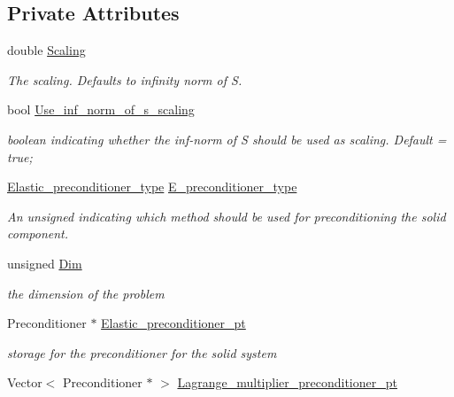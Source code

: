 \subsection*{Private Attributes}
\begin{DoxyCompactItemize}
\item 
double \hyperlink{classoomph_1_1PseudoElasticPreconditioner_a3e2302245fa432f49e3f979cbfe6b3a2}{Scaling}
\begin{DoxyCompactList}\small\item\em The scaling. Defaults to infinity norm of S. \end{DoxyCompactList}\item 
bool \hyperlink{classoomph_1_1PseudoElasticPreconditioner_a3ca651eb7983c61cdaea734b19f2ac25}{Use\+\_\+inf\+\_\+norm\+\_\+of\+\_\+s\+\_\+scaling}
\begin{DoxyCompactList}\small\item\em boolean indicating whether the inf-\/norm of S should be used as scaling. Default = true; \end{DoxyCompactList}\item 
\hyperlink{classoomph_1_1PseudoElasticPreconditioner_acde733e1a111a961d1e714add4e8015d}{Elastic\+\_\+preconditioner\+\_\+type} \hyperlink{classoomph_1_1PseudoElasticPreconditioner_abb84100d37f174e683b2d7a0dd688584}{E\+\_\+preconditioner\+\_\+type}
\begin{DoxyCompactList}\small\item\em An unsigned indicating which method should be used for preconditioning the solid component. \end{DoxyCompactList}\item 
unsigned \hyperlink{classoomph_1_1PseudoElasticPreconditioner_aef0a56e6011e3a7f1c3a2ce171949077}{Dim}
\begin{DoxyCompactList}\small\item\em the dimension of the problem \end{DoxyCompactList}\item 
Preconditioner $\ast$ \hyperlink{classoomph_1_1PseudoElasticPreconditioner_ae5cbfeac8ef38461d7816ca01dbd9eb3}{Elastic\+\_\+preconditioner\+\_\+pt}
\begin{DoxyCompactList}\small\item\em storage for the preconditioner for the solid system \end{DoxyCompactList}\item 
Vector$<$ Preconditioner $\ast$ $>$ \hyperlink{classoomph_1_1PseudoElasticPreconditioner_a705470f8265f77b11eb5a5096a9fe59d}{Lagrange\+\_\+multiplier\+\_\+preconditioner\+\_\+pt}

\end{DoxyCompactItemize}
